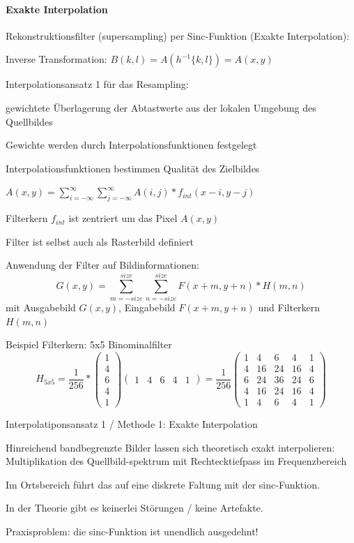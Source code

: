 \documentclass[landscape]{article}
\begin{document}
\begin{multicols}{3}
  \paragraph{Exakte Interpolation}
  Rekonstruktionsfilter (supersampling) per Sinc-Funktion (Exakte Interpolation):
  \begin{itemize*}
    \item Inverse Transformation: $B(k, l) = A(h^{-1} \{k, l\}) = A(x, y )$
    \item Interpolationsansatz 1 für das Resampling:
    \begin{itemize*}
      \item gewichtete Überlagerung der Abtastwerte aus der lokalen Umgebung des Quellbildes
      \item Gewichte werden durch Interpolationsfunktionen festgelegt
      \item Interpolationsfunktionen bestimmen Qualität des Zielbildes
      \item $A(x,y)=\sum_{i=-\infty}^{\infty}\sum_{j=-\infty}^{\infty}A(i,j) * f_{int}(x-i, y-j)$
      \item Filterkern $f_{int}$ ist zentriert um das Pixel $A(x, y)$
      \item Filter ist selbst auch als Rasterbild definiert
    \end{itemize*}
  \end{itemize*}
  
  Anwendung der Filter auf Bildinformationen: 
  $$G(x,y)=\sum_{m=-size}^{size} \sum_{n=-size}^{size} F(x+m, y+n) * H(m,n)$$
  mit Ausgabebild $G(x,y)$, Eingabebild $F(x+m,y+n)$ und Filterkern $H(m,n)$
  
  Beispiel Filterkern: 5x5 Binominalfilter
  $$H_{5x5}=\frac{1}{256} * \begin{pmatrix} 1\\4\\6\\4\\1\end{pmatrix}\begin{pmatrix}1&4&6&4&1\end{pmatrix}=\frac{1}{256}\begin{pmatrix}1&4&6&4&1\\ 4&16&24&16&4\\ 6&24&36&24&6\\ 4&16&24&16&4\\ 1&4&6&4&1\end{pmatrix}$$
  
  Interpolatiponsansatz 1 / Methode 1: Exakte Interpolation
  \begin{itemize*}
    \item Hinreichend bandbegrenzte Bilder lassen sich theoretisch exakt interpolieren: Multiplikation des Quellbild-spektrum mit Rechtecktiefpass im Frequenzbereich
    \item Im Ortsbereich führt das auf eine diskrete Faltung mit der sinc-Funktion.
    \item In der Theorie gibt es keinerlei Störungen / keine Artefakte.
    \item Praxisproblem: die sinc-Funktion ist unendlich ausgedehnt!
  \end{itemize*}
  

\end{multicols}
\end{document}
